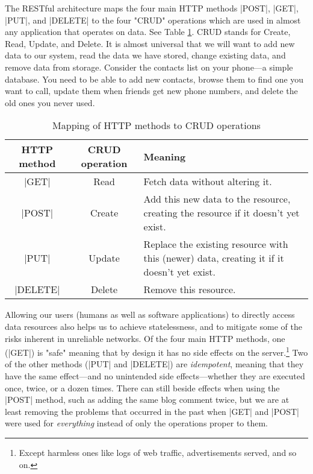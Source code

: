 \documentclass[11pt]{book}
\newcommand{\term}[1]{\emph{#1}} %
\newcommand{\head}[1]{\textnormal{\textbf{#1}}} %
\begin{document}
The RESTful architecture maps the four main HTTP methods |POST|, |GET|, |PUT|, and |DELETE| to the four "CRUD" operations which are used in almost any application that operates on data.  See Table \ref{tab:httpcrud}.  CRUD stands for Create, Read, Update, and Delete.  It is almost universal that we will want to add new data to our system, read the data we have stored, change existing data, and remove data from storage.  Consider the contacts list on your phone---a simple database.  You need to be able to add new contacts, browse them to find one you want to call, update them when friends get new phone numbers, and delete the old ones you never used.

\begin{table}
\centering
\caption{Mapping of HTTP methods to CRUD operations}\label{tab:httpcrud}
\vspace{10pt}
\begin{tabular}{ccp{5cm}}
    \toprule[1.5pt]
    \head{HTTP method} & \head{CRUD operation} & \head{Meaning} \\
    \midrule
    |GET| & Read & Fetch data without altering it.\\
    \midrule
    |POST| & Create & Add this new data to the resource, creating the resource if it doesn't yet exist.\\
    \midrule
    |PUT| & Update & Replace the existing resource with this (newer) data, creating it if it doesn't yet exist.\\
    \midrule
    |DELETE| & Delete & Remove this resource.\\
    \bottomrule[1.5pt]
\end{tabular}
\end{table}
 
Allowing our users (humans as well as software applications) to directly access data resources also helps us to achieve statelessness, and to mitigate some of the risks inherent in unreliable networks.  Of the four main HTTP methods, one (|GET|) is "safe" meaning that by design it has no side effects on the server.\footnote{Except harmless ones like logs of web traffic, advertisements served, and so on.}  Two of the other methods (|PUT| and |DELETE|) are \term{idempotent}, meaning that they have the same effect---and no unintended side effects---whether they are executed once, twice, or a dozen times.  There can still beside effects when using the |POST| method, such as adding the same blog comment twice, but we are at least removing the problems that occurred in the past when |GET| and |POST| were used for \emph{everything} instead of only the operations proper to them.
\end{document}
